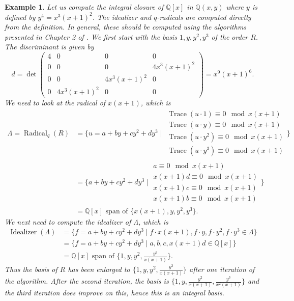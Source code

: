 \documentclass[12pt,reqno]{amsart}
\numberwithin{equation}{section}
\newtheorem{example}[theorem]{Example}
\newcommand{\op}[1]  { \operatorname{ #1 }}
\newcommand{\bbQ}[0]  { \mathbb{Q}}
\begin{document}
\begin{example}
 Let us compute the integral closure of $\bbQ[x]$ in $\bbQ(x,y)$ where $y$ is defined by $y^4=x^3(x+1)^2$. The idealizer and $q$-radicals are computed directly from the definition. In general, these should be computed using the algorithms presented in Chapter 2 of \cite{trager}. We first start with the basis ${1,y,y^2,y^3}$ of the order $R$. The discriminant is given by
\begin{equation*}
 d = \det \left(
\begin{array}{cccc}
 4 & 0 & 0 & 0\\
 0 & 0 & 0 & 4x^3(x+1)^2\\
 0 & 0 & 4x^3(x+1)^2 & 0\\
 0 & 4x^3(x+1)^2 & 0 & 0
\end{array}
\right)=x^9(x+1)^6\text{.}
\end{equation*}
We need to look at the radical of $x(x+1)$, which is
\begin{align*}
\Lambda = \op{Radical}_{q}(R) &= \{u = a+b y+c y^2+d y^3 \mid \begin{array}{l} \op{Trace}(u \cdot 1) \equiv 0 \mod x(x+1)\\ \op{Trace}(u \cdot y) \equiv 0 \mod x(x+1)\\ \op{Trace}(u \cdot y^2) \equiv 0 \mod x(x+1)\\ \op{Trace}(u \cdot y^3) \equiv 0 \mod x(x+1) \end{array} \}\\
&= \{a+b y+c y^2+d y^3 \mid \begin{array}{l} a \equiv 0 \mod x(x+1)\\ x(x+1)d \equiv 0 \mod x(x+1)\\ x(x+1)c \equiv 0 \mod x(x+1)\\ x(x+1)b \equiv 0 \mod x(x+1) \end{array} \}\\
&= \bbQ[x] \text{ span of } \{x(x+1),y,y^2,y^3\}\text{.}
\end{align*}
We next need to compute the idealizer of $\Lambda$, which is
\begin{align*}
 \op{Idealizer}(\Lambda) &= \{f = a+b y+c y^2+d y^3 \mid f \cdot x (x+1), f \cdot y, f \cdot y^2, f \cdot y^3 \in \Lambda\}\\
&=\{f = a+b y+c y^2+d y^3 \mid a,b,c, x(x+1)d \in \bbQ[x] \}\\
&= \bbQ[x] \text{ span of } \{1,y,y^2,\frac{y^3}{x(x+1)}\}\text{.}
\end{align*}
Thus the basis of $R$ has been enlarged to $\{1,y,y^2,\frac{y^3}{x(x+1)}\}$ after one iteration of the algorithm. After the second iteration, the basis is $\{1,y,\frac{y^2}{x(x+1)},\frac{y^3}{x^2(x+1)}\}$ and the third iteration does improve on this, hence this is an integral basis.

\end{example}
\end{document}
